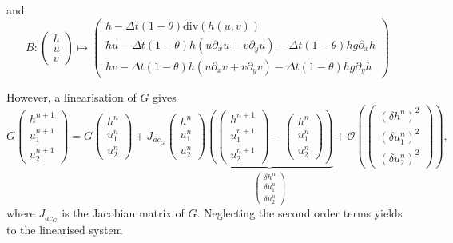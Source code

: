 \documentclass[a4paper, 11pt]{article}
\begin{document}
and
\begin{equation*}
B:
\begin{pmatrix}
h\\u\\v
\end{pmatrix}\mapsto\begin{pmatrix}h-\Delta t(1-\theta)\text{div}(h(u,v))\\
hu-\Delta t(1-\theta)h\left(u\partial_xu+v\partial_yu\right)-\Delta t(1-\theta)hg\partial_x h\\
hv-\Delta t(1-\theta)h\left(u\partial_xv+v\partial_yv\right)-\Delta t(1-\theta)hg\partial_y h
\end{pmatrix}
\end{equation*}


However, 
a linearisation of $G$ gives
\begin{equation*}
G\begin{pmatrix}h^{n+1}\\u_1^{n+1}\\u_2^{n+1}\end{pmatrix}=G\begin{pmatrix}h^{n}\\u_1^{n}\\u_2^{n}\end{pmatrix}+J_{ac_G}\begin{pmatrix}h^n\\u_1^n\\u_2^n\end{pmatrix}\underbrace{\left(\begin{pmatrix}h^{n+1}\\u_1^{n+1}\\u_2^{n+1}\end{pmatrix}-\begin{pmatrix}h^n\\u_1^n\\u_2^n\end{pmatrix}\right)}_{\begin{pmatrix}\delta h^n\\\delta u_1^n\\\delta u_2^n\end{pmatrix}}+\mathcal{O}\left(\begin{pmatrix}(\delta h^n)^2\\(\delta u_1^n)^2\\(\delta u_2^n)^2\end{pmatrix}\right),
\end{equation*}
where $J_{ac_G}$ is the Jacobian matrix of $G$.
Neglecting the second order terms yields to the linearised system
\end{document}
